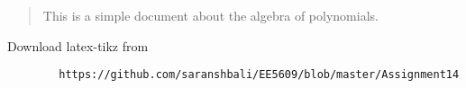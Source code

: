 \documentclass[journal,12pt,twocolumn]{IEEEtran}
\begin{document}
	\maketitle
	\newpage
	\bigskip
	\renewcommand{\thefigure}{\theenumi}
	\renewcommand{\thetable}{\theenumi}
	\begin{abstract}
	This is a simple document about the algebra of polynomials.	
	\end{abstract}
	Download latex-tikz from
	\begin{lstlisting}
		https://github.com/saranshbali/EE5609/blob/master/Assignment14
	\end{lstlisting}
\end{document}
